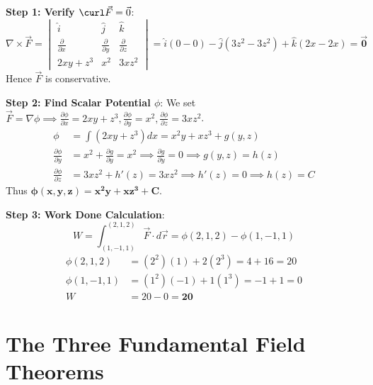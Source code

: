 \begin{solutionbox}
\textbf{Step 1: Verify $\curl\vec{F} = \vec{0}$}:
\begin{equation*}
    \nabla\times\vec{F} = \begin{vmatrix} \hat{i} & \hat{j} & \hat{k} \\ \frac{\partial}{\partial x} & \frac{\partial}{\partial y} & \frac{\partial}{\partial z} \\ 2xy+z^3 & x^2 & 3xz^2 \end{vmatrix} = \hat{i}(0 - 0) - \hat{j}(3z^2 - 3z^2) + \hat{k}(2x - 2x) = \mathbf{\vec{0}}
\end{equation*}
Hence $\vec{F}$ is conservative.

\textbf{Step 2: Find Scalar Potential $\phi$}:
We set $\vec{F} = \nabla\phi \implies \frac{\partial\phi}{\partial x} = 2xy + z^3, \frac{\partial\phi}{\partial y} = x^2, \frac{\partial\phi}{\partial z} = 3xz^2$.
\begin{align*}
    \phi &= \int (2xy+z^3)dx = x^2 y + xz^3 + g(y,z) \\
    \frac{\partial\phi}{\partial y} &= x^2 + \frac{\partial g}{\partial y} = x^2 \implies \frac{\partial g}{\partial y} = 0 \implies g(y,z) = h(z) \\
    \frac{\partial\phi}{\partial z} &= 3xz^2 + h'(z) = 3xz^2 \implies h'(z) = 0 \implies h(z) = C
\end{align*}
Thus $\mathbf{\phi(x,y,z) = x^2 y + xz^3 + C}$.

\textbf{Step 3: Work Done Calculation}:
\begin{equation*}
    W = \int_{(1,-1,1)}^{(2,1,2)} \vec{F}\cdot d\vec{r} = \phi(2,1,2) - \phi(1,-1,1)
\end{equation*}
\begin{align*}
    \phi(2,1,2) &= (2^2)(1) + 2(2^3) = 4 + 16 = 20 \\
    \phi(1,-1,1) &= (1^2)(-1) + 1(1^3) = -1 + 1 = 0 \\
    W &= 20 - 0 = \mathbf{20}
\end{align*}
\end{solutionbox}

\section{The Three Fundamental Field Theorems}


